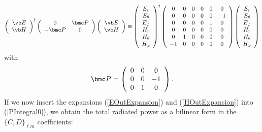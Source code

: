 \documentclass[letterpaper]{article}
\begin{document}
$$
   \left(\begin{array}{c} \vb E \\ \vb H \end{array}\right)^\dagger
   \left(\begin{array}{cc} 0 & \bmc P \\ 
                           -\bmc P & 0 \\
         \end{array}\right)
   \left(\begin{array}{c} \vb E \\ \vb H \end{array}\right)
   \equiv
   \left(\begin{array}{c} 
   E_r \\ E_\theta \\ E_{\varphi} \\ 
   H_r \\ H_\theta \\ H_{\varphi}
   \end{array} \right)^{\dagger}
   \left(\begin{array}{cccccc}
   0 & 0 & 0 & 0 & 0 & 0   \\
   0 & 0 & 0 & 0 & 0 & -1  \\
   0 & 0 & 0 & 0 & 1 & 0   \\
   0 & 0 & 0 & 0 & 0 & 0   \\
   0 & 1 & 0 & 0 & 0 & 0   \\
  -1 & 0 & 0 & 0 & 0 & 0   \\
   \end{array} \right)
   \left(\begin{array}{c} 
   E_r \\ E_\theta \\ E_{\varphi} \\ 
   H_r \\ H_\theta \\ H_{\varphi}
   \end{array} \right)
$$
with
$$\bmc P=\left(\begin{array}{ccc} 
   0 & 0 & 0 \\ 0 & 0 & -1 \\ 0 & 1 & 0 
   \end{array}\right).
$$
If we now insert the expansions (\ref{EOutExpansion}) and
(\ref{HOutExpansion}) into (\ref{PIntegral0}), we obtain
the total radiated power as a bilinear form in the 
$\{C,D\}_{\ell m}$ coefficients:

\end{document}
